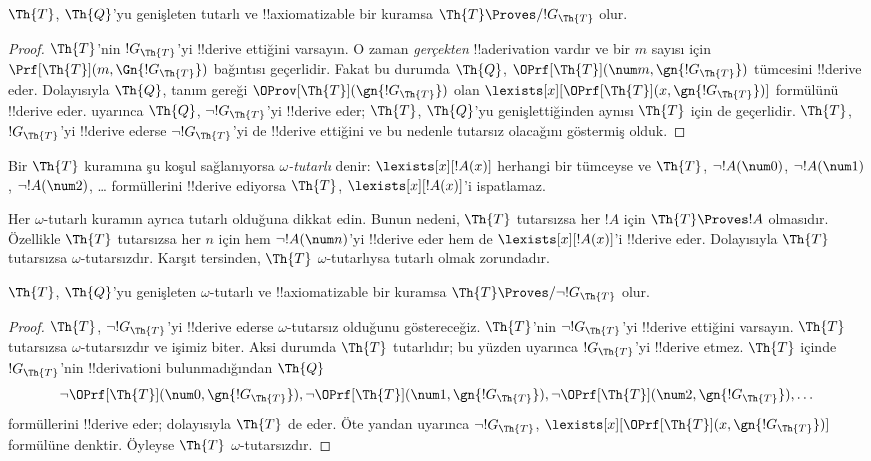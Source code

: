 \begin{lem}
$\Th{T}$, $\Th{Q}$'yu genişleten tutarlı ve !!{axiomatizable} bir kuramsa
$\Th{T} \Proves/ !G_\Th{T}$ olur.
\end{lem}

\begin{proof}
$\Th{T}$'nin $!G_\Th{T}$'yi !!{derive} ettiğini varsayın. O zaman \emph{gerçekten}
!!a{derivation} vardır ve bir $m$ sayısı için
$\Prf[\Th{T}](m,\Gn{!G_\Th{T}})$ bağıntısı geçerlidir. Fakat bu durumda
$\Th{Q}$, $\OPrf[\Th{T}](\num m,\gn{!G_\Th{T}})$ tümcesini !!{derive} eder.
Dolayısıyla $\Th{Q}$, tanım gereği $\OProv[\Th{T}](\gn{!G_\Th{T}})$ olan
$\lexists[x][\OPrf[\Th{T}](x,\gn{!G_\Th{T}})]$ formülünü !!{derive} eder.
 uyarınca $\Th{Q}$, $\lnot !G_\Th{T}$'yi !!{derive} eder;
$\Th{T}$, $\Th{Q}$'yu genişlettiğinden aynısı $\Th{T}$ için de geçerlidir.
$\Th{T}$, $!G_\Th{T}$'yi !!{derive} ederse $\lnot !G_\Th{T}$'yi de
!!{derive} ettiğini ve bu nedenle tutarsız olacağını göstermiş olduk.
\end{proof}

\begin{defn}
Bir $\Th{T}$ kuramına şu koşul sağlanıyorsa \emph{$\omega$-tutarlı} denir:
$\lexists[x][!A(x)]$ herhangi bir tümceyse ve $\Th{T}$,
$\lnot !A(\num 0)$, $\lnot !A(\num 1)$, $\lnot !A(\num 2)$, \dots
formüllerini !!{derive} ediyorsa $\Th{T}$, $\lexists[x][!A(x)]$'i ispatlamaz.
\end{defn}

Her $\omega$-tutarlı kuramın ayrıca tutarlı olduğuna dikkat edin. Bunun nedeni,
$\Th{T}$ tutarsızsa her $!A$ için $\Th{T} \Proves !A$ olmasıdır. Özellikle
$\Th{T}$ tutarsızsa her $n$ için hem $\lnot !A(\num n)$'yi !!{derive} eder
hem de $\lexists[x][!A(x)]$'i !!{derive} eder. Dolayısıyla $\Th{T}$ tutarsızsa
$\omega$-tutarsızdır. Karşıt tersinden, $\Th{T}$ $\omega$-tutarlıysa tutarlı
olmak zorundadır.

\begin{lem}
$\Th{T}$, $\Th{Q}$'yu genişleten $\omega$-tutarlı ve !!{axiomatizable} bir
kuramsa $\Th{T} \Proves/ \lnot !G_\Th{T}$ olur.
\end{lem}

\begin{proof}
$\Th{T}$, $\lnot !G_\Th{T}$'yi !!{derive} ederse $\omega$-tutarsız olduğunu
göstereceğiz. $\Th{T}$'nin $\lnot !G_\Th{T}$'yi !!{derive} ettiğini varsayın.
$\Th{T}$ tutarsızsa $\omega$-tutarsızdır ve işimiz biter. Aksi durumda
$\Th{T}$ tutarlıdır; bu yüzden  uyarınca
$!G_\Th{T}$'yi !!{derive} etmez. $\Th{T}$ içinde $!G_\Th{T}$'nin
!!{derivation}{}i bulunmadığından $\Th{Q}$
\[
\lnot \OPrf[\Th{T}](\num 0, \gn{!G_\Th{T}}), \lnot \OPrf[\Th{T}](\num 1,
\gn{!G_\Th{T}}), \lnot \OPrf[\Th{T}](\num 2, \gn{!G_\Th{T}}), \dots
\]
formüllerini !!{derive} eder; dolayısıyla $\Th{T}$ de eder. Öte yandan
 uyarınca $\lnot !G_\Th{T}$,
$\lexists[x][\OPrf[\Th{T}](x,\gn{!G_\Th{T}})]$ formülüne denktir. Öyleyse
$\Th{T}$ $\omega$-tutarsızdır.
\end{proof}

